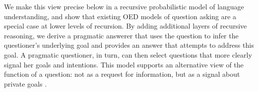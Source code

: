 \documentclass[11pt, floatsintext]{apa6}
\begin{document}
We make this view precise below in a recursive probabilistic model of language understanding, and show that existing OED models of question asking are a special case at lower levels of recursion.
By adding additional layers of recursive reasoning, we derive a pragmatic answerer that uses the question to infer the questioner's underlying goal and provides an answer that attempts to address this goal. 
A pragmatic questioner, in turn, can then select questions that more clearly signal her goals and intentions.
This model supports an alternative view of the function of a question: not as a request for information, but as a signal about private goals \cite{de2012questions}.

%




%
\end{document}
